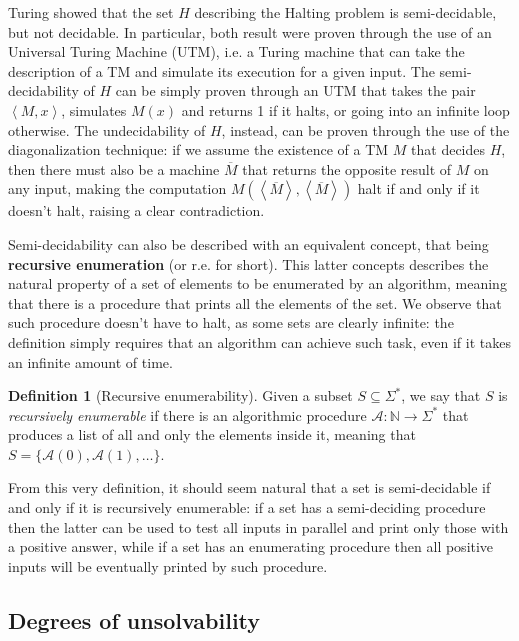 \documentclass[12pt,a4paper]{article}
\theoremstyle{definition}
\newtheorem{definition}{Definition}
\newcommand{\abk}[1]{\left\langle#1\right\rangle}
\newcommand{\N}{\mathbb{N}}                     %
\begin{document}
    Turing showed that the set $H$ describing the Halting problem is semi-decidable, but not decidable. In particular, both result were proven through the use of an Universal Turing Machine (UTM), i.e. a Turing machine that can take the description of a TM and simulate its execution for a given input. The semi-decidability of $H$ can be simply proven through an UTM that takes the pair $\abk{M,x}$, simulates $M(x)$ and returns 1 if it halts, or going into an infinite loop otherwise. The undecidability of $H$, instead, can be proven through the use of the diagonalization technique: if we assume the existence of a TM $M$ that decides $H$, then there must also be a machine $\overline{M}$ that returns the opposite result of $M$ on any input, making the computation $M(\abk{\overline{M}}, \abk{\overline{M}})$ halt if and only if it doesn't halt, raising a clear contradiction.

    Semi-decidability can also be described with an equivalent concept, that being \textbf{recursive enumeration} (or r.e. for short). This latter concepts describes the natural property of a set of elements to be enumerated by an algorithm, meaning that there is a procedure that prints all the elements of the set. We observe that such procedure doesn't have to halt, as some sets are clearly infinite: the definition simply requires that an algorithm can achieve such task, even if it takes an infinite amount of time. 

    \begin{definition}[Recursive enumerability]
        Given a subset $S \subseteq \Sigma^*$, we say that $S$ is \textit{recursively enumerable} if there is an algorithmic procedure $\mathcal{A} : \N \to \Sigma^*$ that produces a list of all and only the elements inside it, meaning that $S = \{\mathcal{A}(0), \mathcal{A}(1), \ldots\}$.
    \end{definition}

    From this very definition, it should seem natural that a set is semi-decidable if and only if it is recursively enumerable: if a set has a semi-deciding procedure then the latter can be used to test all inputs in parallel and print only those with a positive answer, while if a set has an enumerating procedure then all positive inputs will be eventually printed by such procedure. 

    \subsection{Degrees of unsolvability}
\end{document}
